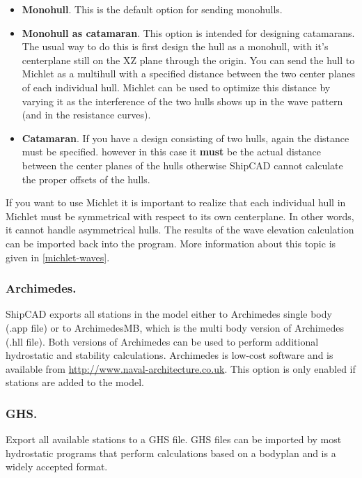 \documentclass[12pt]{article}
\begin{document}
\begin{itemize}

  \item \textbf{Monohull}. This is the default option for sending monohulls.

  \item \textbf{Monohull as catamaran}. This option is intended for designing catamarans. The usual
way to do this is first design the hull as a monohull, with it's centerplane still on the XZ
plane through the origin. You can send the hull to Michlet as a multihull with a specified
distance between the two center planes of each individual hull. Michlet can be used to
optimize this distance by varying it as the interference of the two hulls shows up in the
wave pattern (and in the resistance curves).

  \item \textbf{Catamaran}. If you have a design consisting of two hulls, again the distance must be
specified. however in this case it \textbf{must} be the actual distance between the center planes
of the hulls otherwise ShipCAD cannot calculate the proper offsets of
the hulls.

\end{itemize}

If you want to use Michlet it is important to realize that each
individual hull in Michlet must be symmetrical with respect to its own
centerplane. In other words, it cannot handle asymmetrical hulls.  The
results of the wave elevation calculation can be imported back into
the program. More information about this topic is given in \ref{michlet-waves}.

\subsubsection{Archimedes.}
ShipCAD exports all stations in the model either to Archimedes single
body (.app file) or to ArchimedesMB, which is the multi body version
of Archimedes (.hll file). Both versions of Archimedes can be used to
perform additional hydrostatic and stability calculations. Archimedes
is low-cost software and is available
from \url{http://www.naval-architecture.co.uk}. This option is only
enabled if stations are added to the model.

\subsubsection{GHS.}
Export all available stations to a GHS file. GHS files can be imported
by most hydrostatic programs that perform calculations based on a
bodyplan and is a widely accepted format.
\end{document}
